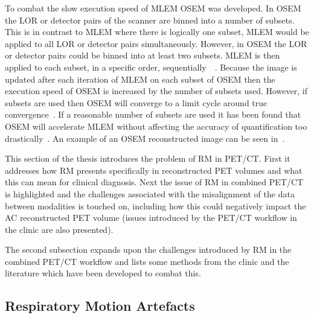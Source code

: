             To combat the slow execution speed of \gls{MLEM} \gls{OSEM} was developed. In \gls{OSEM} the \gls{LOR} or detector pairs of the scanner are binned into a number of subsets. This is in contrast to \gls{MLEM} where there is logically one subset, \gls{MLEM} would be applied to all \gls{LOR} or detector pairs simultaneously. However, in \gls{OSEM} the \gls{LOR} or detector pairs could be binned into at least two subsets. \gls{MLEM} is then applied to each subset, in a specific order, sequentially~~. Because the image is updated after each iteration of \gls{MLEM} on each subset of \gls{OSEM} then the execution speed of \gls{OSEM} is increased by the number of subsets used. However, if%
            subsets are used %
            then  \gls{OSEM} will converge to a limit cycle around true convergence~. If a reasonable number of subsets are used it has been found that \gls{OSEM} will accelerate \gls{MLEM} without affecting the accuracy of quantification too drastically~. An example of an \gls{OSEM} reconstructed image can be seen in~.
            
        This section of the thesis introduces the problem of \gls{RM} in \gls{PET}/\gls{CT}. First it addresses how \gls{RM} presents specifically in reconstructed \gls{PET} volumes and what this can mean for clinical diagnosis. Next the issue of \gls{RM} in combined \gls{PET}/\gls{CT} is highlighted and the challenges associated with the misalignment of the data between modalities is touched on, including how this could negatively impact the \gls{AC} reconstructed \gls{PET} volume (issues introduced by the \gls{PET}/\gls{CT} workflow in the clinic are also presented).
            
        The second subsection expands upon the challenges introduced by \gls{RM} in the combined \gls{PET}/\gls{CT} workflow and lists some methods from the clinic and the literature which have been developed to combat this.
        
        \subsection{Respiratory Motion Artefacts} \label{sec:respiratory_motion_artefacts}
            
